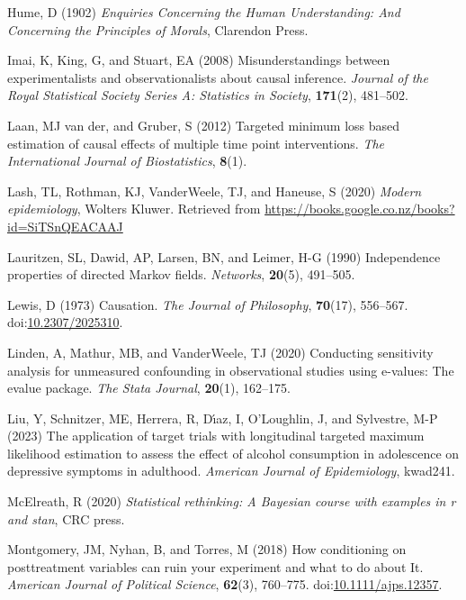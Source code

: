 \documentclass[
  single column]{article}
\newlength{\cslhangindent}
\newenvironment{CSLReferences}[2] %
 {\begin{list}{}{%
  \setlength{\itemindent}{0pt}
  \setlength{\leftmargin}{0pt}
  \setlength{\parsep}{0pt}
  \ifodd #1
   \setlength{\leftmargin}{\cslhangindent}
   \setlength{\itemindent}{-1\cslhangindent}
  \fi
  \setlength{\itemsep}{#2\baselineskip}}}
 {\end{list}}
\begin{document}
\begin{CSLReferences}{1}{0}
Hume, D (1902) \emph{Enquiries Concerning the Human Understanding: And
Concerning the Principles of Morals}, Clarendon Press.

Imai, K, King, G, and Stuart, EA (2008) Misunderstandings between
experimentalists and observationalists about causal inference.
\emph{Journal of the Royal Statistical Society Series A: Statistics in
Society}, \textbf{171}(2), 481--502.

Laan, MJ van der, and Gruber, S (2012) Targeted minimum loss based
estimation of causal effects of multiple time point interventions.
\emph{The International Journal of Biostatistics}, \textbf{8}(1).

Lash, TL, Rothman, KJ, VanderWeele, TJ, and Haneuse, S (2020)
\emph{Modern epidemiology}, Wolters Kluwer. Retrieved from
\url{https://books.google.co.nz/books?id=SiTSnQEACAAJ}

Lauritzen, SL, Dawid, AP, Larsen, BN, and Leimer, H-G (1990)
Independence properties of directed {M}arkov fields. \emph{Networks},
\textbf{20}(5), 491--505.

Lewis, D (1973) Causation. \emph{The Journal of Philosophy},
\textbf{70}(17), 556--567.
doi:\href{https://doi.org/10.2307/2025310}{10.2307/2025310}.

Linden, A, Mathur, MB, and VanderWeele, TJ (2020) Conducting sensitivity
analysis for unmeasured confounding in observational studies using
e-values: The evalue package. \emph{The Stata Journal}, \textbf{20}(1),
162--175.

Liu, Y, Schnitzer, ME, Herrera, R, Dı́az, I, O'Loughlin, J, and
Sylvestre, M-P (2023) The application of target trials with longitudinal
targeted maximum likelihood estimation to assess the effect of alcohol
consumption in adolescence on depressive symptoms in adulthood.
\emph{American Journal of Epidemiology}, kwad241.

McElreath, R (2020) \emph{Statistical rethinking: A {B}ayesian course
with examples in r and stan}, CRC press.

Montgomery, JM, Nyhan, B, and Torres, M (2018) How conditioning on
posttreatment variables can ruin your experiment and what to do about
It. \emph{American Journal of Political Science}, \textbf{62}(3),
760--775.
doi:\href{https://doi.org/10.1111/ajps.12357}{10.1111/ajps.12357}.


\end{CSLReferences}
\end{document}
